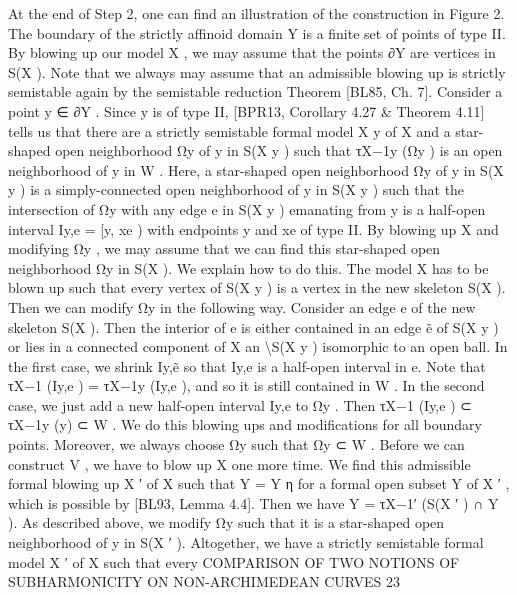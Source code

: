 \documentclass[
  10pt,
]{article}
\newenvironment{Shaded}{}{}
\newcommand{\NormalTok}[1]{#1}
\begin{document}
\begin{Shaded}
\begin{Highlighting}[]
\NormalTok{   At the end of Step 2, one can find an illustration of the construction in Figure 2. The}
\NormalTok{boundary of the strictly affinoid domain Y is a finite set of points of type II. By blowing}
\NormalTok{up our model X , we may assume that the points ∂Y are vertices in S(X ). Note that}
\NormalTok{we always may assume that an admissible blowing up is strictly semistable again by the}
\NormalTok{semistable reduction Theorem [BL85, Ch. 7]. Consider a point y ∈ ∂Y . Since y is of type}
\NormalTok{II, [BPR13, Corollary 4.27 \& Theorem 4.11] tells us that there are a strictly semistable}
\NormalTok{formal model X y of X and a star{-}shaped open neighborhood Ωy of y in S(X y ) such that}
\NormalTok{τX−1y (Ωy ) is an open neighborhood of y in W . Here, a star{-}shaped open neighborhood}
\NormalTok{Ωy of y in S(X y ) is a simply{-}connected open neighborhood of y in S(X y ) such that the}
\NormalTok{intersection of Ωy with any edge e in S(X y ) emanating from y is a half{-}open interval}
\NormalTok{Iy,e = [y, xe ) with endpoints y and xe of type II. By blowing up X and modifying Ωy , we}
\NormalTok{may assume that we can find this star{-}shaped open neighborhood Ωy in S(X ). We explain}
\NormalTok{how to do this. The model X has to be blown up such that every vertex of S(X y ) is a}
\NormalTok{vertex in the new skeleton S(X ). Then we can modify Ωy in the following way. Consider}
\NormalTok{an edge e of the new skeleton S(X ). Then the interior of e is either contained in an}
\NormalTok{edge ẽ of S(X y ) or lies in a connected component of X an \textbackslash{}S(X y ) isomorphic to an open}
\NormalTok{ball. In the first case, we shrink Iy,ẽ so that Iy,e is a half{-}open interval in e. Note that}
\NormalTok{τX−1 (Iy,e ) = τX−1y (Iy,e ), and so it is still contained in W . In the second case, we just add}
\NormalTok{a new half{-}open interval Iy,e to Ωy . Then τX−1 (Iy,e ) ⊂ τX−1y (y) ⊂ W . We do this blowing}
\NormalTok{ups and modifications for all boundary points. Moreover, we always choose Ωy such that}
\NormalTok{Ωy ⊂ W . Before we can construct V , we have to blow up X one more time. We find}
\NormalTok{this admissible formal blowing up X ′ of X such that Y = Y η for a formal open subset Y}
\NormalTok{of X ′ , which is possible by [BL93, Lemma 4.4]. Then we have Y = τX−1′ (S(X ′ ) ∩ Y ). As}
\NormalTok{described above, we modify Ωy such that it is a star{-}shaped open neighborhood of y in}
\NormalTok{S(X ′ ). Altogether, we have a strictly semistable formal model X ′ of X such that every}
\NormalTok{   COMPARISON OF TWO NOTIONS OF SUBHARMONICITY ON NON{-}ARCHIMEDEAN CURVES 23}



\end{Highlighting}
\end{Shaded}
\end{document}
